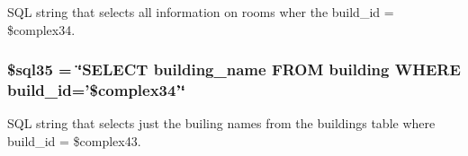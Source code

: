 \-S\-Q\-L string that selects all information on rooms wher the build\-\_\-id = \$complex34. \hypertarget{displayRooms_8php_a82f8cf7bf047f4e029d5bf5b430b8a6e}{
\subsubsection[{\$sql35}]{\setlength{\rightskip}{0pt plus 5cm}\$sql35 = \char`\"{}\-S\-E\-L\-E\-C\-T building\-\_\-name \-F\-R\-O\-M building \-W\-H\-E\-R\-E build\-\_\-id='\$complex34'\char`\"{}}}\label{displayRooms_8php_a82f8cf7bf047f4e029d5bf5b430b8a6e}
\-S\-Q\-L string that selects just the builing names from the buildings table where build\-\_\-id = \$complex43. 